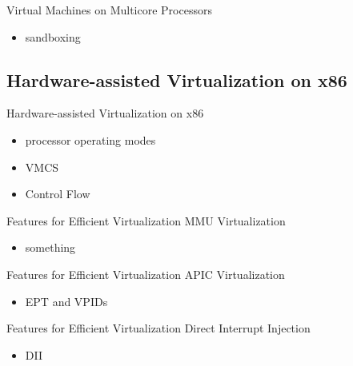 \documentclass[10pt,hyperref={hyperfootnotes=false}, xcolor={usenames, dvipsnames}]{beamer}
\begin{document}
\begin{frame}{Virtual Machines on Multicore Processors}
  \begin{itemize}
  \item {sandboxing}
  \end{itemize}
\end{frame}

\subsection{Hardware-assisted Virtualization on x86}
\begin{frame}{Hardware-assisted Virtualization on x86}
  \begin{itemize}
  \item {processor operating modes}
  \item {VMCS}
  \item {Control Flow}
  \end{itemize}
\end{frame}

\begin{frame}{Features for Efficient Virtualization} {MMU Virtualization}
  \begin{itemize}
  \item {something}
  \end{itemize}
 	\begingroup
	
	\endgroup
\end{frame}

\begin{frame}{Features for Efficient Virtualization} {APIC Virtualization}
  \begin{itemize}
  \item {EPT and VPIDs}
  \end{itemize}
 	\begingroup
	
	\endgroup
\end{frame}

\begin{frame}{Features for Efficient Virtualization} {Direct Interrupt Injection}
  \begin{itemize}
  \item {DII}
  \end{itemize}
 	\begingroup
	
	\endgroup
\end{frame}
\end{document}
